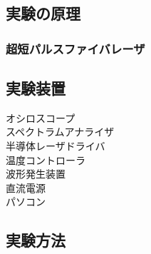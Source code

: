 \documentclass[titlepage]{jsarticle}
\begin{document}
\subsection{実験の原理}
\subsubsection{超短パルスファイバレーザ}

\subsection{実験装置}
オシロスコープ\\
スペクトラムアナライザ\\
半導体レーザドライバ\\
温度コントローラ\\
波形発生装置\\
直流電源\\
パソコン\\
\subsection{実験方法}
\end{document}
